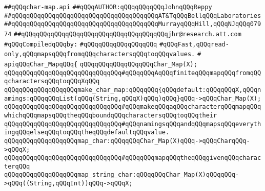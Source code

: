 \label{src/lib/src/char-map.api}
\verb|##qQQqchar-map.api|\newline
\verb|##qQQqAUTHOR:qQQqqQQqqQQqJohnqQQqReppy|\newline
\verb|##qQQqqQQqqQQqqQQqqQQqqQQqqQQqqQQqqQQqqQQqAT&TqQQqBellqQQqLaboratories|\newline
\verb|##qQQqqQQqqQQqqQQqqQQqqQQqqQQqqQQqqQQqqQQqMurrayqQQqHill,qQQqNJqQQq07974|\newline
\verb|##qQQqqQQqqQQqqQQqqQQqqQQqqQQqqQQqqQQqqQQqjhr@research.att.com|\newline
\newline
\verb|#qQQqCompiledqQQqby:|\newline
\verb|#qQQqqQQqqQQqqQQqqQQq|\newline
\newline
\newline
\newline
\newline
\verb|#qQQqFast,qQQqread-only,qQQqmapsqQQqfromqQQqcharactersqQQqtoqQQqvalues.|\newline
\verb|#|\newline
\newline
\verb|apiqQQqChar_MapqQQq{|\newline
\newline
\verb|qQQqqQQqqQQqqQQqqQQqChar_Map(X);|\newline
\verb|qQQqqQQqqQQqqQQqqQQqqQQqqQQqqQQq#qQQqqQQqAqQQqfiniteqQQqmapqQQqfromqQQqcharactersqQQqtoqQQqXqQQq|\newline
\newline
\verb|qQQqqQQqqQQqqQQqqQQqmake_char_map:qQQqqQQq{qQQqdefault:qQQqqQQqX,qQQqnamings:qQQqqQQqList(qQQq(String,qQQqX)qQQq)qQQq}qQQq->qQQqChar_Map(X);|\newline
\verb|qQQqqQQqqQQqqQQqqQQqqQQqqQQqqQQq#qQQqmakeqQQqaqQQqcharacterqQQqmapqQQqwhichqQQqmapsqQQqtheqQQqboundqQQqcharactersqQQqtoqQQqtheir|\newline
\verb|qQQqqQQqqQQqqQQqqQQqqQQqqQQqqQQq#qQQqnamingsqQQqandqQQqmapsqQQqeverythingqQQqelseqQQqtoqQQqtheqQQqdefaultqQQqvalue.|\newline
\newline
\verb|qQQqqQQqqQQqqQQqqQQqmap_char:qQQqqQQqChar_Map(X)qQQq->qQQqCharqQQq->qQQqX;|\newline
\verb|qQQqqQQqqQQqqQQqqQQqqQQqqQQqqQQq#qQQqqQQqmapqQQqtheqQQqgivenqQQqcharacterqQQq|\newline
\newline
\verb|qQQqqQQqqQQqqQQqqQQqmap_string_char:qQQqqQQqChar_Map(X)qQQqqQQq->qQQq((String,qQQqInt))qQQq->qQQqX;|\newline

